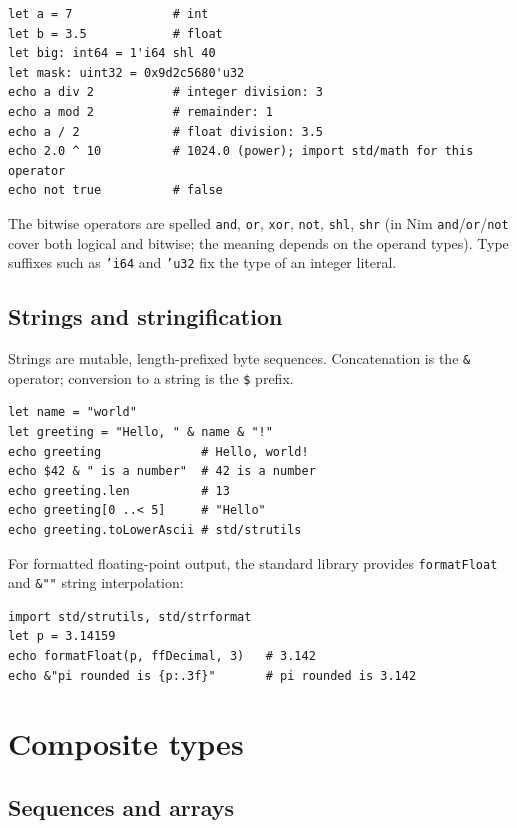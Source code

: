 \documentclass[justified, sixbynine]{tufte-book}
\def\ft{\small\tt}
\theoremstyle{plain}%
\newtheorem * {corollary}{Corollary}
\theoremstyle{definition}
\theoremstyle{remark}
\newtheorem * {remark}{Remark}
\newtheorem * {note}{Note}
\begin{document}
\begin{fullwidth}
\begin{lstlisting}
let a = 7              # int
let b = 3.5            # float
let big: int64 = 1'i64 shl 40
let mask: uint32 = 0x9d2c5680'u32
echo a div 2           # integer division: 3
echo a mod 2           # remainder: 1
echo a / 2             # float division: 3.5
echo 2.0 ^ 10          # 1024.0 (power); import std/math for this operator
echo not true          # false
\end{lstlisting}

The bitwise operators are spelled {\ft and}, {\ft or}, {\ft xor}, {\ft not}, {\ft shl}, {\ft shr} (in Nim {\ft and}/{\ft or}/{\ft not} cover both logical and bitwise; the meaning depends on the operand types). Type suffixes such as {\ft 'i64} and {\ft 'u32} fix the type of an integer literal.

\goodbreak\subsection{Strings and stringification}


Strings are mutable, length-prefixed byte sequences. Concatenation is the {\ft \&} operator; conversion to a string is the {\ft \$} prefix.

\begin{lstlisting}
let name = "world"
let greeting = "Hello, " & name & "!"
echo greeting              # Hello, world!
echo $42 & " is a number"  # 42 is a number
echo greeting.len          # 13
echo greeting[0 ..< 5]     # "Hello"
echo greeting.toLowerAscii # std/strutils
\end{lstlisting}

For formatted floating-point output, the standard library provides {\ft formatFloat} and {\ft \&""} string interpolation:

\begin{lstlisting}
import std/strutils, std/strformat
let p = 3.14159
echo formatFloat(p, ffDecimal, 3)   # 3.142
echo &"pi rounded is {p:.3f}"       # pi rounded is 3.142
\end{lstlisting}

\goodbreak\section{Composite types}

\goodbreak\subsection{Sequences and arrays}


\end{fullwidth}
\end{document}
